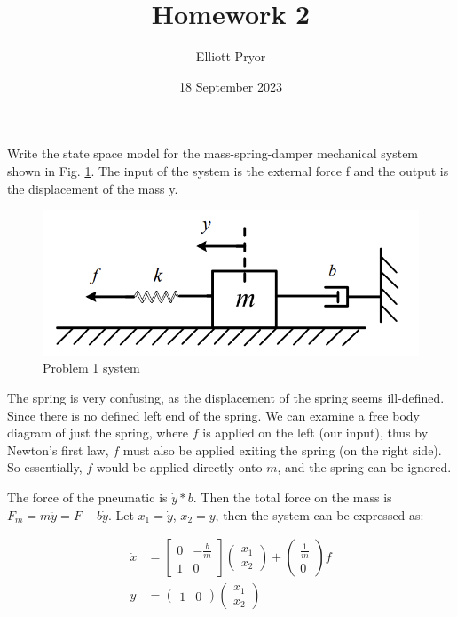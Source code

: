 \documentclass[11pt]{article}
\title{Homework 2}
\author{Elliott Pryor}
\date{18 September 2023}
\begin{document}
\maketitle

Write the state space model for the mass-spring-damper mechanical system
shown in Fig. \ref{fig:p1}. The input of the system is the external force f and the output is the
displacement of the mass y.

\begin{figure}[h] 
    \centering
    \includegraphics[width=0.55 \linewidth]{p1}
    \caption{Problem 1 system}
    \label{fig:p1}
\end{figure}

\soln

The spring is very confusing, as the displacement of the spring seems ill-defined.
Since there is no defined left end of the spring. 
We can examine a free body diagram of just the spring,
where $f$ is applied on the left (our input), thus by Newton's first law,
$f$ must also be applied exiting the spring (on the right side). 
So essentially, $f$ would be applied directly onto $m$, and the spring can be ignored.

The force of the pneumatic is $\dot{y} * b$.
Then the total force on the mass is $F_m = m\ddot{y} = F - b \dot{y}$.
Let $x_1 = \dot{y}$, $x_2 = {y}$, then the system can be expressed as:

\begin{align}
    \dot{x} &= \begin{bmatrix}
        0 & -\frac{b}{m} \\
        1 & 0
    \end{bmatrix} \begin{pmatrix}
        x_1 \\ x_2
    \end{pmatrix} + \begin{pmatrix}
        \frac{1}{m} \\ 0
    \end{pmatrix} f \\
    y &= \begin{pmatrix}
        1 & 0
    \end{pmatrix} \begin{pmatrix}
        x_1 \\ x_2
    \end{pmatrix}
\end{align}
\end{document}
